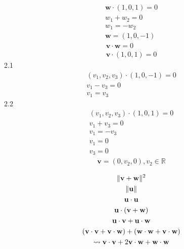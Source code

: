 \documentclass{report}
\begin{document}
\begin{question}{13}{}
    \begin{gather*}
        \mathbf{w} \cdot (1, 0, 1) = 0 \\
        w_1 + w_2 = 0 \\
        w_1 = -w_2 \\
        \mathbf{w} = (1, 0, -1)
    \end{gather*}
    \begin{gather}
        \mathbf{v} \cdot \mathbf{w} = 0 \\
        \mathbf{v} \cdot (1, 0, 1)= 0 
    \end{gather}
    2.1
    \begin{gather*}
        (v_1, v_2, v_3) \cdot (1, 0, -1) = 0 \\
        v_1 - v_3 = 0 \\
        v_1 = v_3
    \end{gather*}
    2.2
    \begin{gather*}
        (v_1, v_2, v_3) \cdot (1, 0, 1) = 0 \\
        v_1 + v_3 = 0 \\
        v_1 = -v_3 \\
        v_1 = 0 \\ 
        v_3 = 0
    \end{gather*}
    \begin{gather*}
        \mathbf{v} = (0, v_2, 0), v_2 \in \mathbb{R}
    \end{gather*}
\end{question}
\begin{question}{19}{}
    \begin{gather*}
        \lVert \mathbf{v} + \mathbf{w} \rVert ^ 2 \\
    \lVert \mathbf{u} \rVert \\
    \mathbf{u} \cdot \mathbf{u} \\
    \mathbf{u} \cdot (\mathbf{v} + \mathbf{w}) \\
    \mathbf{u} \cdot \mathbf{v} + \mathbf{u} \cdot \mathbf{w} \\
    ( \mathbf{v} \cdot \mathbf{v} + \mathbf{v} \cdot \mathbf{w}) + (\mathbf{w} \cdot \mathbf{w} + \mathbf{v} \cdot \mathbf{w}) \\
    \leadsto \mathbf{v} \cdot \mathbf{v} + 2 \mathbf{v} \cdot \mathbf{w} + \mathbf{w} \cdot \mathbf{w}
    \end{gather*}
\end{question}
\end{document}
